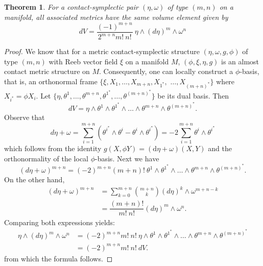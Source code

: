 \documentclass[12pt]{amsart}
\newtheorem{theorem}{Theorem}
\theoremstyle{definition}
\theoremstyle{remark}
\begin{document}
\begin{theorem}\label{theoremdV}
For a contact-symplectic pair $(\eta, \omega)$ of type $(m,n)$ on a manifold, all associated metrics have the same volume element given by
\begin{equation*}
dV= \dfrac{(-1)^{m+n}}{2^{m+n} m! \ n!}\ \eta\wedge (d\eta)^{m}\wedge\omega^{n}
\end{equation*}
\end{theorem}
\begin{proof}
We know that for a metric contact-symplectic structure $(\eta, \omega, g, \phi)$ of type $(m,n)$ with Reeb vector field $\xi$ on a manifold $M$, $(\phi, \xi, \eta, g)$ is an almost contact metric structure on $M$.
Consequently, one can locally construct a $\phi$-basis, that is, an orthonormal frame $\{ \xi, X_1, \dots , X_{m+n},  X_{1^*},$ $\dots , X_{(m+n)^*}\}$ where $X_{i^*}=\phi X_i$.
Let $\{ \eta, \theta^1, \dots , \theta^{m+n}, \theta^{1^*}, \dots , \theta^{(m+n)^*}\}$ be its dual basis. 
Then
\begin{equation*}
dV= \eta \wedge \theta^1 \wedge  \theta^{1^*} \wedge  \dots \wedge \theta^{m+n} \wedge \theta^{(m+n)^*}.
\end{equation*}
Observe that
\begin{equation*}
d\eta+\omega =\sum_{i=1}^{m+n} (\theta^{i^*} \wedge \theta^i-\theta^i \wedge  \theta^{i^*})=-2\sum_{i=1}^{m+n}\theta^i \wedge  \theta^{i^*}
\end{equation*}
which follows from the identity $g(X, \phi Y) = (\mathrm{d}\eta + \omega)(X, Y)$ and the orthonormality of the local $\phi$-basis. 
Next we have
\begin{equation*}
(d\eta+\omega )^{m+n}=(-2)^{m+n} (m+n)! \ \theta^1 \wedge  \theta^{1^*} \wedge  \dots \wedge \theta^{m+n} \wedge \theta^{(m+n)^*}.
\end{equation*}
On the other hand,
\begin{align*}
(d\eta+\omega )^{m+n}&=\sum_{k=0}^{m+n} \binom{m+n}{k} (d\eta)^k \wedge \omega^{m+n-k} \\
				   &= \dfrac{(m+n)!}{m!\ n!}(d\eta)^m \wedge \omega^n .
\end{align*}
Comparing both expressions yields:
\begin{align*}
\eta\wedge(d\eta)^m \wedge \omega^n&=(-2)^{m+n} m!\ n! \ \eta \wedge \theta^1 \wedge  \theta^{1^*} \wedge  \dots \wedge \theta^{m+n} \wedge \theta^{(m+n)^*}\\
								&=(-2)^{m+n} m!\ n!  \ dV .
\end{align*}
from which the formula follows.
\end{proof}
\end{document}
